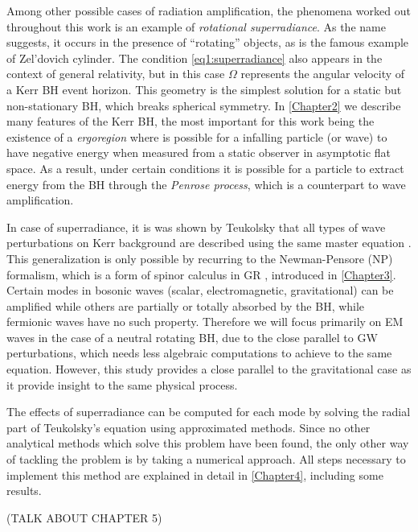 Among other possible cases of radiation amplification, the phenomena worked out throughout this work is an example of \emph{rotational superradiance}. 
As the name suggests, it occurs in the presence of ``rotating'' objects, as is the famous example of Zel'dovich cylinder.
The condition \eqref{eq1:superradiance} also appears in the context of general relativity, but in this case $\Omega$ represents the angular velocity of a Kerr BH event horizon.
This geometry is the simplest solution for a static but non-stationary BH, which breaks spherical symmetry. 
In \cref{Chapter2} we describe many features of the Kerr BH, the most important for this work being the existence of a \emph{ergoregion} where is possible for a infalling particle (or wave) to have negative energy when measured from a static observer in asymptotic flat space.
As a result, under certain conditions it is possible for a particle to extract energy from the BH through the \emph{Penrose process}, which is a counterpart to wave amplification.

In case of superradiance, it is was shown by Teukolsky that all types of wave perturbations on Kerr background are described using the same master equation \cite{Teukolsky1972}.
This generalization is only possible by recurring to the Newman-Pensore (NP) formalism, which is a form of spinor calculus in GR \cite{Newman1962}, introduced in \cref{Chapter3}.
Certain modes in bosonic waves (scalar, electromagnetic, gravitational) can be amplified while others are partially or totally absorbed by the BH, while fermionic waves have no such property.
Therefore we will focus primarily on EM waves in the case of a neutral rotating BH, due to the close parallel to GW perturbations, which needs less algebraic computations to achieve to the same equation.
However, this study provides a close parallel to the gravitational case as it provide insight to the same physical process.

The effects of superradiance can be computed for each mode by solving the radial part of Teukolsky's equation using approximated methods.
Since no other analytical methods which solve this problem have been found, the only other way of tackling the problem is by taking a numerical approach. All steps necessary to implement this method are explained in detail in \cref{Chapter4}, including some results.


(TALK ABOUT CHAPTER 5)




